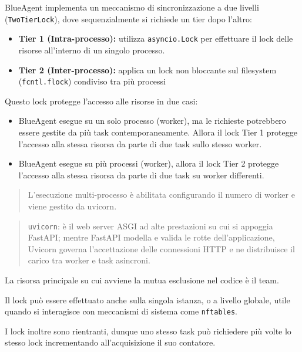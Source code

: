 BlueAgent implementa un meccanismo di sincronizzazione a due livelli
(\passthrough{\lstinline!TwoTierLock!}), dove sequenzialmente si
richiede un tier dopo l'altro:

\begin{itemize}
\tightlist
\item
  \textbf{Tier 1 (Intra-processo):} utilizza
  \passthrough{\lstinline!asyncio.Lock!} per effettuare il lock delle
  risorse all'interno di un singolo processo.
\item
  \textbf{Tier 2 (Inter-processo):} applica un lock non bloccante sul
  filesystem (\passthrough{\lstinline!fcntl.flock!}) condiviso tra più
  processi
\end{itemize}

Questo lock protegge l'accesso alle risorse in due casi:

\begin{itemize}
\tightlist
\item
  BlueAgent esegue su un solo processo (worker), ma le richieste
  potrebbero essere gestite da più task contemporaneamente. Allora il
  lock Tier 1 protegge l'accesso alla stessa risorsa da parte di due
  task sullo stesso worker.
\item
  BlueAgent esegue su più processi (worker), allora il lock Tier 2
  protegge l'accesso alla stessa risorsa da parte di due task su worker
  differenti.
\end{itemize}

\begin{quote}
L'esecuzione multi-processo è abilitata configurando il numero di worker
e viene gestito da uvicorn.
\end{quote}

\begin{quote}
\passthrough{\lstinline!uvicorn!}: è il web server ASGI ad alte
prestazioni su cui si appoggia FastAPI; mentre FastAPI modella e valida
le rotte dell'applicazione, Uvicorn governa l'accettazione delle
connessioni HTTP e ne distribuisce il carico tra worker e task
asincroni.
\end{quote}

La risorsa principale su cui avviene la mutua esclusione nel codice è il
team.

Il lock può essere effettuato anche sulla singola istanza, o a livello
globale, utile quando si interagisce con meccanismi di sistema come
\passthrough{\lstinline!nftables!}.

I lock inoltre sono rientranti, dunque uno stesso task può richiedere
più volte lo stesso lock incrementando all'acquisizione il suo
contatore.

